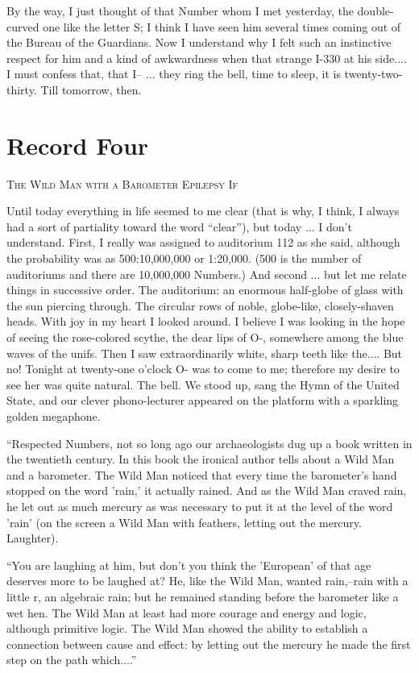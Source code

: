 \documentclass[11pt,openany]{book}
\newcommand{\bookchapterplain}[1]{%
  \clearpage\phantomsection
  \chapter*{#1}%
  \addcontentsline{toc}{chapter}{#1}%
  \markboth{#1}{#1}\thispagestyle{plain}}
\begin{document}
By the way, I just thought of that Number whom I met yesterday, the double-curved one like the letter S; I think I have seen him several times coming out of the Bureau of the Guardians. Now I understand why I felt such an instinctive respect for him and a kind of awkwardness when that strange I-330 at his side.... I must confess that, that I-- ... they ring the bell, time to sleep, it is twenty-two-thirty. Till tomorrow, then.

\bookchapterplain{Record Four}

\begin{center}\textsc{The Wild Man with a Barometer Epilepsy If}\end{center}

Until today everything in life seemed to me clear (that is why, I think, I always had a sort of partiality toward the word ``clear''), but today ... I don't understand. First, I really was assigned to auditorium 112 as she said, although the probability was as 500:10,000,000 or 1:20,000. (500 is the number of auditoriums and there are 10,000,000 Numbers.) And second ... but let me relate things in successive order. The auditorium: an enormous half-globe of glass with the sun piercing through. The circular rows of noble, globe-like, closely-shaven heads. With joy in my heart I looked around. I believe I was looking in the hope of seeing the rose-colored scythe, the dear lips of O-, somewhere among the blue waves of the unifs. Then I saw extraordinarily white, sharp teeth like the.... But no! Tonight at twenty-one o'clock O- was to come to me; therefore my desire to see her was quite natural. The bell. We stood up, sang the Hymn of the United State, and our clever phono-lecturer appeared on the platform with a sparkling golden megaphone.

``Respected Numbers, not so long ago our archaeologists dug up a book written in the twentieth century. In this book the ironical author tells about a Wild Man and a barometer. The Wild Man noticed that every time the barometer's hand stopped on the word 'rain,' it actually rained. And as the Wild Man craved rain, he let out as much mercury as was necessary to put it at the level of the word 'rain' (on the screen a Wild Man with feathers, letting out the mercury. Laughter).

``You are laughing at him, but don't you think the 'European' of that age deserves more to be laughed at? He, like the Wild Man, wanted rain,--rain with a little r, an algebraic rain; but he remained standing before the barometer like a wet hen. The Wild Man at least had more courage and energy and logic, although primitive logic. The Wild Man showed the ability to establish a connection between cause and effect: by letting out the mercury he made the first step on the path which....''
\end{document}
